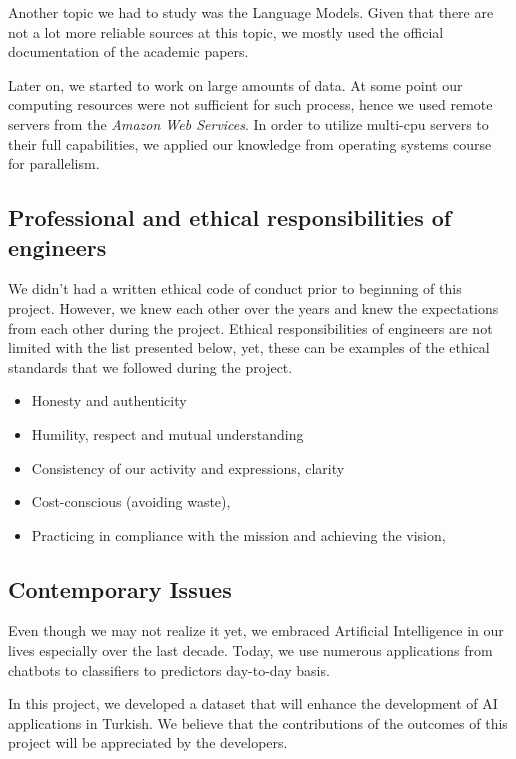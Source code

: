 \documentclass{mefsdp}
\begin{document}
	Another topic we had to study was the Language Models. Given that there are not a lot more reliable sources at this topic, we mostly used the official documentation of the academic papers.
	
	Later on, we started to work on large amounts of data. At some point our computing resources were not sufficient for such process, hence we used remote servers from the \textit{Amazon Web Services}. In order to utilize multi-cpu servers to their full capabilities, we applied our knowledge from operating systems course for parallelism. 
	
	\subsection{Professional and ethical responsibilities of engineers}
	
	We didn't had a written ethical code of conduct prior to beginning of this project. However, we knew each other over the years and knew the expectations from each other during the project.
	Ethical responsibilities of engineers are not limited with the list presented below, yet, these can be examples of the ethical standards that we followed during the project.
	
	\begin{itemize}
		\item	Honesty and authenticity
		\item	Humility, respect and mutual understanding
		\item	Consistency of our activity and expressions, clarity
		\item	Cost-conscious (avoiding waste),
		\item	Practicing in compliance with the mission and achieving the vision,
	\end{itemize}

	
	\subsection{Contemporary Issues}
	
	Even though we may not realize it yet, we embraced Artificial Intelligence in our lives especially over the last decade. Today, we use numerous applications from chatbots to classifiers to predictors day-to-day basis. \newline \par
	
	In this project, we developed a dataset that will enhance the development of AI applications in Turkish. We believe that the contributions of the outcomes of this project will be appreciated by the developers. \newline \par
	
\end{document}
